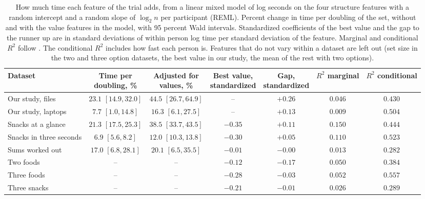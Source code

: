 \begin{table}[t]
\centering
\footnotesize
\setlength{\tabcolsep}{4pt}
\caption{How much time each feature of the trial adds, from a linear mixed model of log seconds on the four structure features with a random intercept and a random slope of $\log_2 n$ per participant (REML). Percent change in time per doubling of the set, without and with the value features in the model, with 95 percent Wald intervals. Standardized coefficients of the best value and the gap to the runner up are in standard deviations of within person log time per standard deviation of the feature. Marginal and conditional $R^2$ follow \citet{nakagawa2013}. The conditional $R^2$ includes how fast each person is. Features that do not vary within a dataset are left out (set size in the two and three option datasets, the best value in our study, the mean of the rest with two options).}
\label{tab:lmm}
\begin{tabular}{lcccccc}
\toprule
Dataset & \makecell{Time per\\doubling, \%} & \makecell{Adjusted for\\values, \%} & \makecell{Best value,\\standardized} & \makecell{Gap,\\standardized} & \makecell{$R^2$\\marginal} & \makecell{$R^2$\\conditional} \\
\midrule
Our study, files & \makecell{$23.1$ \\ {\scriptsize $[14.9, 32.0]$}} & \makecell{$44.5$ \\ {\scriptsize $[26.7, 64.9]$}} & -- & $+0.26$ & $0.046$ & $0.430$ \\
Our study, laptops & \makecell{$7.7$ \\ {\scriptsize $[1.0, 14.8]$}} & \makecell{$16.3$ \\ {\scriptsize $[6.1, 27.5]$}} & -- & $+0.13$ & $0.009$ & $0.504$ \\
Snacks at a glance & \makecell{$21.3$ \\ {\scriptsize $[17.5, 25.3]$}} & \makecell{$38.5$ \\ {\scriptsize $[33.7, 43.5]$}} & $-0.35$ & $+0.11$ & $0.150$ & $0.444$ \\
Snacks in three seconds & \makecell{$6.9$ \\ {\scriptsize $[5.6, 8.2]$}} & \makecell{$12.0$ \\ {\scriptsize $[10.3, 13.8]$}} & $-0.30$ & $+0.05$ & $0.110$ & $0.523$ \\
Sums worked out & \makecell{$17.0$ \\ {\scriptsize $[6.8, 28.1]$}} & \makecell{$20.1$ \\ {\scriptsize $[6.5, 35.5]$}} & $-0.01$ & $-0.00$ & $0.013$ & $0.282$ \\
Two foods & -- & -- & $-0.12$ & $-0.17$ & $0.050$ & $0.384$ \\
Three foods & -- & -- & $-0.28$ & $-0.03$ & $0.052$ & $0.557$ \\
Three snacks & -- & -- & $-0.21$ & $-0.01$ & $0.026$ & $0.289$ \\
\bottomrule
\end{tabular}
\end{table}
